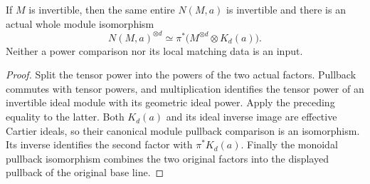 \begin{lemma}
\label{lem:kn-nadel-whole-rounded-root-line-power}
\leanok
{}
If $M$ is invertible, then the same entire $N(M,a)$ is invertible and
there is an actual whole module isomorphism
\[
 N(M,a)^{\otimes d}\simeq
 \pi^*\bigl(M^{\otimes d}\otimes K_d(a)\bigr).
\]
Neither a power comparison nor its local matching data is an input.
\end{lemma}
\begin{proof}
Split the tensor power into the powers of the two actual factors.
Pullback commutes with tensor powers, and multiplication identifies the
tensor power of an invertible ideal module with its geometric ideal
power. Apply the preceding equality to the latter. Both $K_d(a)$ and
its ideal inverse image are effective Cartier ideals, so their canonical
module pullback comparison is an isomorphism. Its inverse identifies
the second factor with $\pi^*K_d(a)$. Finally the monoidal pullback
isomorphism combines the two original factors into the displayed
pullback of the original base line.
\end{proof}
